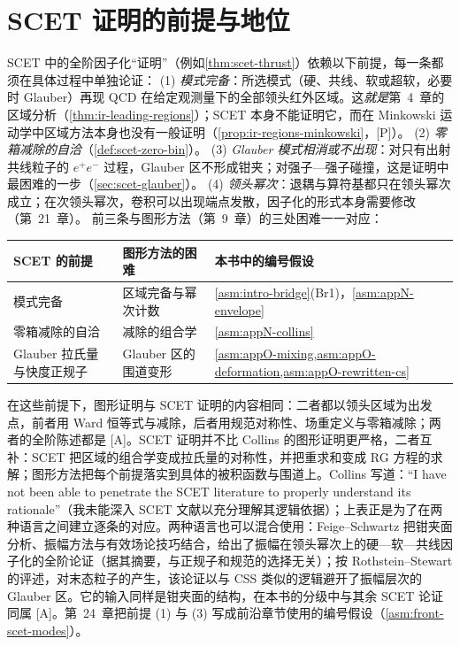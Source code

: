 \section{SCET 证明的前提与地位}\label{sec:scet-status}

\begin{remark}\label{rem:scet-assumptions}
SCET 中的全阶因子化“证明”（例如\cref{thm:scet-thrust}）依赖以下前提，每一条都须在具体过程中单独论证：
(1) \emph{模式完备}：所选模式（硬、共线、软或超软，必要时 Glauber）再现 QCD 在给定观测量下的全部领头红外区域。这\emph{就是}第~4~章的区域分析（\cref{thm:ir-leading-regions}）；SCET 本身不能证明它，而在 Minkowski 运动学中区域方法本身也没有一般证明（\cref{prop:ir-regions-minkowski}，[P]）。
(2) \emph{零箱减除的自洽}（\cref{def:scet-zero-bin}）。
(3) \emph{Glauber 模式相消或不出现}：对只有出射共线粒子的 $e^+e^-$ 过程，Glauber 区不形成钳夹；对强子—强子碰撞，这是证明中最困难的一步（\cref{sec:scet-glauber}）。
(4) \emph{领头幂次}：退耦与算符基都只在领头幂次成立；在次领头幂次，卷积可以出现端点发散，因子化的形式本身需要修改（第~21~章）。
前三条与图形方法（第~9~章）的三处困难一一对应：
\begin{center}\small
\renewcommand{\arraystretch}{1.1}
\begin{tabular}{@{}lll@{}}
\toprule
SCET 的前提 & 图形方法的困难 & 本书中的编号假设 \\
\midrule
模式完备 & 区域完备与幂次计数 & \cref{asm:intro-bridge}(Br1)，\cref{asm:appN-envelope} \\
零箱减除的自洽 & 减除的组合学 & \cref{asm:appN-collins} \\
Glauber 拉氏量与快度正规子 & Glauber 区的围道变形 & \cref{asm:appO-mixing,asm:appO-deformation,asm:appO-rewritten-cs} \\
\bottomrule
\end{tabular}
\end{center}
在这些前提下，图形证明与 SCET 证明的内容相同：二者都以领头区域为出发点，前者用 Ward 恒等式与减除，后者用规范对称性、场重定义与零箱减除；两者的全阶陈述都是 [A]。SCET 证明并不比 Collins 的图形证明更严格，二者互补：SCET 把区域的组合学变成拉氏量的对称性，并把重求和变成 RG 方程的求解；图形方法把每个前提落实到具体的被积函数与围道上。Collins 写道：“I have not been able to penetrate the SCET literature to properly understand its rationale”（我未能深入 SCET 文献以充分理解其逻辑依据）\cite[第~15.9~节]{Collins2011}；上表正是为了在两种语言之间建立逐条的对应。两种语言也可以混合使用：Feige--Schwartz 把钳夹面分析、振幅方法与有效场论技巧结合，给出了振幅在领头幂次上的硬—软—共线因子化的全阶论证（据其摘要，与正规子和规范的选择无关）\cite{Feige:2013zla,FeigeSchwartz2014}；按 Rothstein--Stewart 的评述，对末态粒子的产生，该论证以与 CSS 类似的逻辑避开了振幅层次的 Glauber 区\cite[第~10.1~节]{RothsteinStewart2016}。它的输入同样是钳夹面的结构，在本书的分级中与其余 SCET 论证同属 [A]。第~24~章把前提 (1) 与 (3) 写成前沿章节使用的编号假设（\cref{asm:front-scet-modes}）。
\end{remark}

